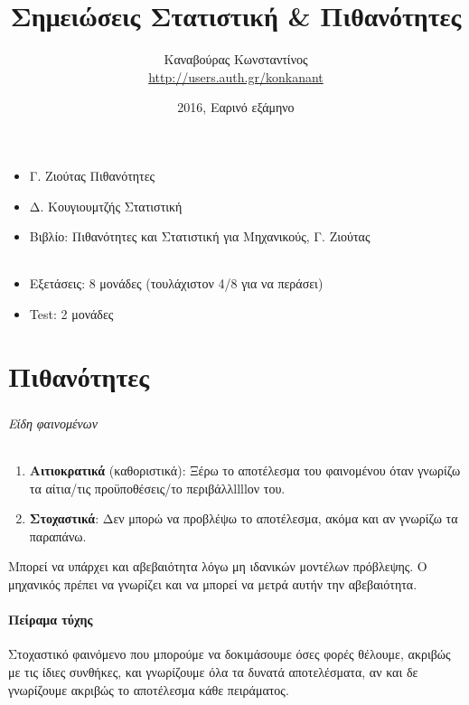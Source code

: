 \documentclass[11pt,a4paper,titlepage,draft]{article}
\title{Σημειώσεις Στατιστική \& Πιθανότητες}
\date{2016, Εαρινό εξάμηνο}
\author{Καναβούρας Κωνσταντίνος \\ \textlatin{\url{http://users.auth.gr/konkanant}}}
\begin{document}
\maketitle


\newpage

\begin{itemize}
\item Γ. Ζιούτας Πιθανότητες
\item Δ. Κουγιουμτζής Στατιστική
\item Βιβλίο: Πιθανότητες και Στατιστική για Μηχανικούς, Γ. Ζιούτας
\end{itemize}

\paragraph{}

\begin{itemize}
\item Εξετάσεις: 8 μονάδες (τουλάχιστον 4/8 για να περάσει)
\item \textlatin{Test}: 2 μονάδες
\end{itemize}

\part{Πιθανότητες}

\section{}
\paragraph{Είδη φαινομένων}

\begin{enumerate}
\item \textbf{Αιτιοκρατικά} (καθοριστικά): Ξέρω το αποτέλεσμα του φαινομένου όταν γνωρίζω τα αίτια/τις προϋποθέσεις/το περιβάλλllllον του.
\item \textbf{Στοχαστικά}: Δεν μπορώ να προβλέψω το αποτέλεσμα, ακόμα και αν γνωρίζω τα παραπάνω.
\end{enumerate}
Μπορεί να υπάρχει και αβεβαιότητα λόγω μη ιδανικών μοντέλων πρόβλεψης. Ο μηχανικός πρέπει να γνωρίζει και να μπορεί να μετρά αυτήν την αβεβαιότητα.

\subsection{Πείραμα τύχης}
Στοχαστικό φαινόμενο που μπορούμε να δοκιμάσουμε όσες φορές θέλουμε, ακριβώς με τις ίδιες συνθήκες, και γνωρίζουμε όλα τα δυνατά αποτελέσματα, αν και δε γνωρίζουμε ακριβώς το αποτέλεσμα κάθε πειράματος.
\end{document}

